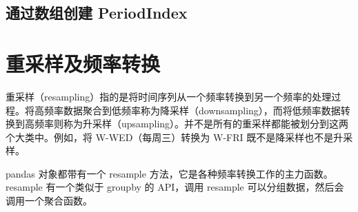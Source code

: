 \subsection{通过数组创建 PeriodIndex}
\section{重采样及频率转换}
重采样（resampling）指的是将时间序列从一个频率转换到另一个频率的处理过程。将高频率数据聚合到低频率称为降采样（downsampling），而将低频率数据转换到高频率则称为升采样（upsampling）。并不是所有的重采样都能被划分到这两个大类中。例如，将 W-WED（每周三）转换为 W-FRI 既不是降采样也不是升采样。

pandas 对象都带有一个 resample 方法，它是各种频率转换工作的主力函数。resample 有一个类似于 groupby 的 API，调用 resample 可以分组数据，然后会调用一个聚合函数。

